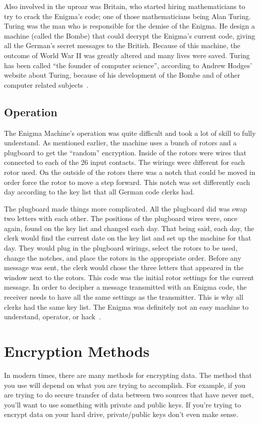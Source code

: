 \documentclass[12pt,a4paper,titlepage]{article}
\begin{document}
Also involved in the uproar was Britain, who started hiring mathematicians to
try to crack the Enigma's code; one of those mathematicians being Alan Turing.
Turing was the man who is responsible for the demise of the Enigma. He design a
machine (called the Bombe) that could decrypt the Enigma's current code, giving
all the German's secret messages to the British. Because of this machine, the
outcome of World War II was greatly altered and many lives were saved. Turing has
been called ``the founder of computer science'', according to Andrew Hodges'
website about Turing, because of his development of the Bombe and of other
computer related subjects~\cite{wilcox2006solving}.

\subsection{Operation}
The Enigma Machine's operation was quite difficult and took a lot of skill to
fully understand. As mentioned earlier, the machine uses a bunch of rotors and a
plugboard to get the ``random'' encryption. Inside of the rotors were wires that
connected to each of the 26 input contacts. The wirings were different for each
rotor used. On the outside of the rotors there was a notch that could be moved
in order force the rotor to move a step forward. This notch was set differently
each day according to the key list that all German code clerks had.

The plugboard made things more complicated. All the plugboard did was swap two
letters with each other. The positions of the plugboard wires were, once again,
found on the key list and changed each day. That being said, each day, the
clerk would find the current date on the key list and set up the machine for
that day. They would plug in the plugboard wirings, select the rotors to be
used, change the notches, and place the rotors in the appropriate order. Before
any message was sent, the clerk would chose the three letters that appeared
in the window next to the rotors. This code was the initial rotor settings for
the current message. In order to decipher a message transmitted with an Enigma
code, the receiver needs to have all the same settings as the transmitter. This
is why all clerks had the same key list. The Enigma was definitely not an
easy machine to understand, operator, or hack~\cite{wilcox2006solving}.

\section{Encryption Methods}
In modern times, there are many methods for encrypting data. The method that you
use will depend on what you are trying to accomplish. For example, if you are 
trying to do secure transfer of data between two sources that have never met, 
you'll want to use something with private and public keys. If you're trying 
to encrypt data on your hard drive, private/public keys don't even make sense. 
\end{document}
